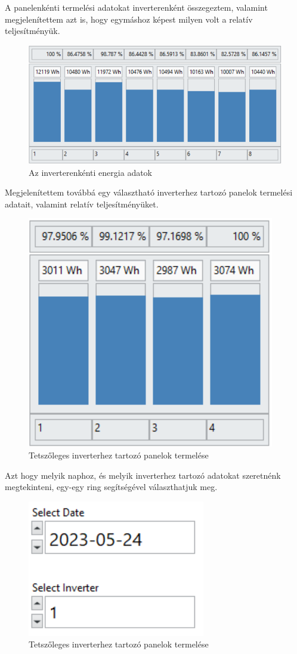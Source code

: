A panelenkénti termelési adatokat inverterenként összegeztem, valamint
megjelenítettem azt is, hogy egymáshoz képest milyen volt a relatív
teljesítményük.

\begin{figure}[ht]
  \centering
  \includegraphics[height=.3\textwidth]{static/windows-inverter-energy.png}
  \caption{Az inverterenkénti energia adatok}
  \label{fig:inverter-energy}
\end{figure}

Megjelenítettem továbbá egy választható inverterhez tartozó panelok
termelési adatait, valamint relatív teljesítményüket.

\begin{figure}[ht]
  \centering
  \includegraphics[height=.3\textwidth]{static/windows-panel-energy.png}
  \caption{Tetszőleges inverterhez tartozó panelok termelése}
  \label{fig:panel-energy}
\end{figure}

Azt hogy melyik naphoz, és melyik inverterhez tartozó adatokat szeretnénk
megtekinteni, egy-egy ring segítségével választhatjuk meg.
\begin{figure}[ht]
  \centering
  \includegraphics[height=.2\textwidth]{static/windows-ring.png}
  \caption{Tetszőleges inverterhez tartozó panelok termelése}
  \label{fig:ring}
\end{figure}

